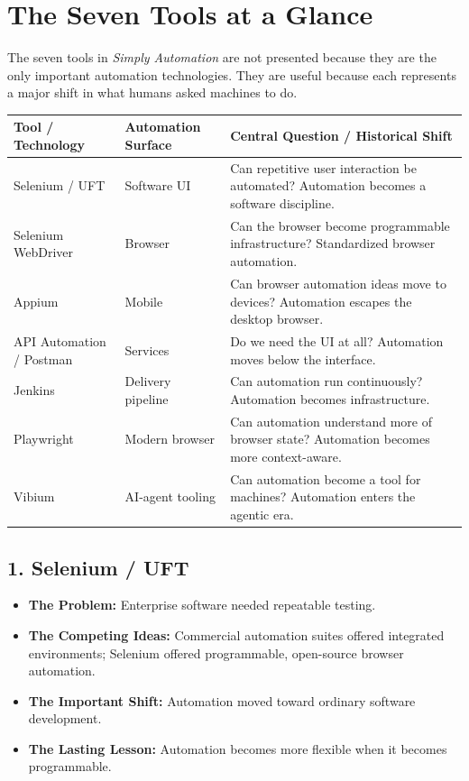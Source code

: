 \documentclass[11pt,twoside]{book}
\begin{document}
\chapter{The Seven Tools at a Glance}
\label{app:tools}

The seven tools in \textit{Simply Automation} are not presented because they are the only important automation technologies.
They are useful because each represents a major shift in what humans asked machines to do.

\noindent\small
\begin{tabularx}{\textwidth}{lXX}
\toprule
\textbf{Tool / Technology} & \textbf{Automation Surface} & \textbf{Central Question / Historical Shift} \\
\midrule
Selenium / UFT & Software UI & Can repetitive user interaction be automated? Automation becomes a software discipline. \\
Selenium WebDriver & Browser & Can the browser become programmable infrastructure? Standardized browser automation. \\
Appium & Mobile & Can browser automation ideas move to devices? Automation escapes the desktop browser. \\
API Automation / Postman & Services & Do we need the UI at all? Automation moves below the interface. \\
Jenkins & Delivery pipeline & Can automation run continuously? Automation becomes infrastructure. \\
Playwright & Modern browser & Can automation understand more of browser state? Automation becomes more context-aware. \\
Vibium & AI-agent tooling & Can automation become a tool for machines? Automation enters the agentic era. \\
\bottomrule
\end{tabularx}
\normalsize

\section*{1. Selenium / UFT}
\begin{itemize}[nosep]
    \item \textbf{The Problem:} Enterprise software needed repeatable testing.
    \item \textbf{The Competing Ideas:} Commercial automation suites offered integrated environments; Selenium offered programmable, open-source browser automation.
    \item \textbf{The Important Shift:} Automation moved toward ordinary software development.
    \item \textbf{The Lasting Lesson:} Automation becomes more flexible when it becomes programmable.
\end{itemize}
\end{document}
